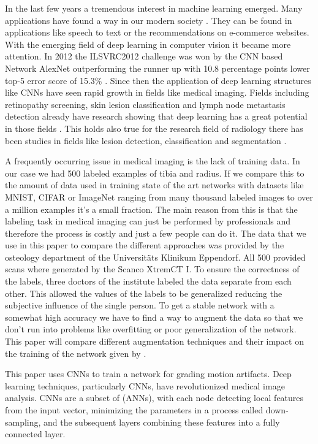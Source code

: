 \documentclass[
a4paper, 
12pt,
grayscalebody, %
abstract=on,
twoside, BCOR10mm, 12pt, DIV13,headinclude, footexclude, final, abstracton, openright
]{ibireprt}
\numberwithin{equation}{chapter}
\numberwithin{table}{chapter}
\numberwithin{figure}{chapter}
\numberwithin{algorithm}{chapter}
\numberwithin{example}{chapter}
\numberwithin{example}{chapter}
\begin{document}
In the last few years a tremendous interest in machine learning emerged. Many applications have found a way in our modern society \cite{LeCun2015}. They can be found in applications like speech to text or the recommendations on e-commerce websites.
With the emerging field of deep learning in computer vision it became more attention. In 2012 the ILSVRC2012 challenge  was won by the CNN based Network AlexNet outperforming the runner up with 10.8 percentage points lower top-5 error score of 15.3\% . Since then the application of deep learning structures like CNNs have seen rapid growth in fields like medical imaging. Fields including retinopathy screening, skin lesion classification and lymph node metastasis detection already have research showing that deep learning has a great potential in those fields . This holds also true for the research field of radiology there has been studies in fields like lesion detection, classification and segmentation \cite{Yamashita2018}.

A frequently occurring issue in medical imaging is the lack of training data. In our case we had 500 labeled examples of tibia and radius. If we compare this to the amount of data used in training state of the art networks with datasets like MNIST, CIFAR or ImageNet ranging from many thousand labeled images to over a million examples it's a small fraction. The main reason from this is that the labeling task in medical imaging can just be performed by professionals and therefore the process is costly and just a few people can do it.
The data that we use in this paper to compare the different approaches was provided by the osteology department of the Universitäts Klinikum Eppendorf. All 500 provided scans where generated by the Scanco XtremCT I.
To ensure the correctness of the labels, three doctors of the institute labeled the data separate from each other. This allowed the values of the labels to be generalized reducing the subjective influence of the single person. To get a stable network with a somewhat high accuracy we have to find a way to augment the data so that we don't run into problems like overfitting or poor generalization of the network. This paper will compare different augmentation techniques and their impact on the training of the network given by \cite{Walle2023}. 

 
This paper uses CNNs to train a network for grading motion artifacts. Deep learning techniques, particularly CNNs, have revolutionized medical image analysis. CNNs are a subset of (ANNs), with each node detecting local features from the input vector, minimizing the parameters in a process called down-sampling, and the subsequent layers combining these features into a fully connected layer.%
\end{document}
